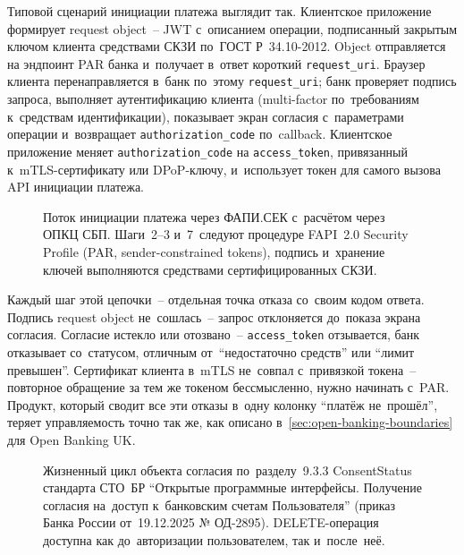 Типовой сценарий инициации платежа выглядит так. Клиентское
приложение формирует request object~-- JWT с~описанием операции,
подписанный закрытым ключом клиента средствами СКЗИ по~ГОСТ
Р~34.10-2012. Object отправляется на эндпоинт PAR банка и~получает
в~ответ короткий \texttt{request\_uri}. Браузер клиента
перенаправляется в~банк по~этому \texttt{request\_uri}; банк
проверяет подпись запроса, выполняет аутентификацию клиента
(multi-factor по~требованиям к~средствам идентификации), показывает
экран согласия с~параметрами операции и~возвращает
\texttt{authorization\_code} по~callback. Клиентское приложение
меняет \texttt{authorization\_code} на \texttt{access\_token},
привязанный к~mTLS-сертификату или DPoP-ключу, и~использует токен
для самого вызова API инициации платежа.

\begin{figure}[tbp]
  \centering
  \caption{Поток инициации платежа через ФАПИ.СЕК с~расчётом
  через ОПКЦ СБП. Шаги~2--3 и~7~следуют процедуре FAPI~2.0
  Security Profile (PAR, sender-constrained tokens), подпись
  и~хранение ключей выполняются средствами сертифицированных
  СКЗИ.}\label{fig:fapi-sec-flow}
\end{figure}

Каждый шаг этой цепочки~-- отдельная точка отказа со~своим
кодом ответа. Подпись request object не~сошлась~-- запрос
отклоняется до~показа экрана согласия. Согласие истекло
или отозвано~-- \texttt{access\_token} отзывается, банк отказывает
со~статусом, отличным от~\enquote{недостаточно средств} или
\enquote{лимит превышен}. Сертификат клиента в~mTLS не~совпал
с~привязкой токена~-- повторное обращение за тем же токеном
бессмысленно, нужно начинать с~PAR. Продукт, который сводит все эти отказы в~одну
колонку \enquote{платёж не~прошёл}, теряет управляемость точно
так же, как описано в~\ref{sec:open-banking-boundaries}
для Open Banking UK.

\begin{figure}[tbp]
  \centering
  \caption{Жизненный цикл объекта согласия по~разделу~9.3.3
  ConsentStatus стандарта СТО~БР \enquote{Открытые программные
  интерфейсы. Получение согласия на~доступ к~банковским счетам
  Пользователя} (приказ Банка России от~19.12.2025
  № ОД-2895). DELETE-операция доступна как до~авторизации
  пользователем, так и~после~неё.}\label{fig:fapi-sec-consent-lifecycle}
\end{figure}

